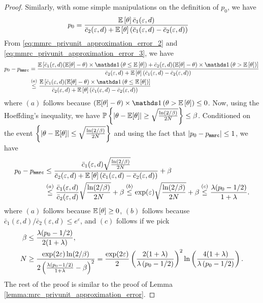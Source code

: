 \begin{proof}
Similarly, with some simple manipulations on the definition of $p_0$, we have 
\begin{align}
p_0 
& = \frac{\mathbb{E}\left[ \theta \right]  \bar{c}_1(\varepsilon,d)}{ \bar{c}_2(\varepsilon,d) + \mathbb{E}\left[ \theta \right] \left(  \bar{c}_1(\varepsilon,d) -  \bar{c}_2(\varepsilon,d) \right)} \label{eq:mmrc_privunit_approximation_error_3}
\end{align}
From \eqref{eq:mmrc_privunit_approximation_error_2} and \eqref{eq:mmrc_privunit_approximation_error_3}, we have
\begin{align}
    p_0 - p_\texttt{mmrc} 
    & =  \frac{\E\lb  \bar{c}_1(\varepsilon,d) (\E[\theta] - \theta) \times \Indicator \lp \theta \leq \E\lb \theta \rb \rp +  \bar{c}_2(\varepsilon,d) (\E[\theta] - \theta) \times \Indicator \lp \theta > \E\lb \theta \rb \rp \rb}{ \bar{c}_2(\varepsilon,d) + \E\lb \theta \rb \lp  \bar{c}_1(\varepsilon,d) -  \bar{c}_2(\varepsilon,d) \rp}
     \\
    & \stackrel{(a)}{\leq} \frac{\E\lb  \bar{c}_1(\varepsilon,d) (\E[\theta] - \theta) \times \Indicator \lp \theta \leq \E\lb \theta \rb \rp \rb}{ \bar{c}_2(\varepsilon,d) + \E\lb \theta \rb \lp  \bar{c}_1(\varepsilon,d) -  \bar{c}_2(\varepsilon,d) \rp}
\end{align}
where $(a)$ follows because $(\E[\theta] - \theta) \times \Indicator \lp \theta > \E\lb \theta \rb \rp \leq 0$. Now, using the Hoeffding's inequality, we have $\mathbb{P}\left\{ \left\lvert \theta - \mathbb{E}[\theta] \right\rvert \geq \sqrt{\frac{\ln\left( 2/\beta \right)}{2N}} \right\} \leq \beta$. Conditioned on the event $\left\{ \left\lvert \theta - \mathbb{E}[\theta] \right\rvert \leq \sqrt{\frac{\ln\left( 2/\beta \right)}{2N}} \right\}$ and using the fact that $\left\lvert p_0 - p_\texttt{mmrc}  \right\rvert\leq 1$, we have
\begin{align}
    p_0 - p_\texttt{mmrc} & \leq \frac{ \bar{c}_1(\varepsilon,d) \sqrt{\frac{\ln(2/\beta)}{2N}}}{ \bar{c}_2(\varepsilon,d) + \mathbb{E}\left[ \theta \right] \left(  \bar{c}_1(\varepsilon,d) -  \bar{c}_2(\varepsilon,d) \right)}  + \beta \\
    & \stackrel{(a)}{\leq}  \frac{ \bar{c}_1(\varepsilon,d)}{ \bar{c}_2(\varepsilon,d)} \sqrt{\frac{\ln(2/\beta)}{2N}} + \beta
    \stackrel{(b)}{\leq} \exp(\varepsilon) \sqrt{\frac{\ln(2/\beta)}{2N}} + \beta \stackrel{(c)}{\leq} \frac{\lambda(p_0 - 1/2)}{1+\lambda}. \label{eq:mmrc_privunit_approximation_error_6}
\end{align}
where $(a)$ follows because $\mathbb{E}\left[ \theta \right] \geq 0$, $(b)$ follows because $ \bar{c}_1(\varepsilon,d)/ \bar{c}_2(\varepsilon,d) \leq e^{\varepsilon}$, and $(c)$ follows if we pick 
\begin{align*}
    \beta & \leq \frac{\lambda(p_0 - 1/2)}{2(1+\lambda)},\\
    N & \geq\frac{\exp(2\varepsilon) \ln(2/\beta)}{2\left( \frac{\lambda(p_0 - 1/2)}{1+\lambda} - \beta \right)^2}
    = \frac{\exp(2\varepsilon)}{2}\left(\frac{2 (1+\lambda)}{\lambda \left( p_0 -1/2 \right)}\right)^2 \ln\left( \frac{4(1+\lambda)}{\lambda \left( p_0 -1/2 \right)} \right).
\end{align*}
The rest of the proof is similar to the proof of Lemma \ref{lemma:mrc_privunit_approximation_error}.
\end{proof}

